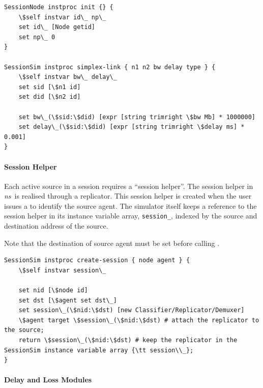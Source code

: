 \begin{verbatim}
SessionNode instproc init {} {
    \$self instvar id\_ np\_
    set id\_ [Node getid]
    set np\_ 0
}

SessionSim instproc simplex-link { n1 n2 bw delay type } {
    \$self instvar bw\_ delay\_
    set sid [\$n1 id]
    set did [\$n2 id]

    set bw\_(\$sid:\$did) [expr [string trimright \$bw Mb] * 1000000]
    set delay\_(\$sid:\$did) [expr [string trimright \$delay ms] * 0.001]
}
\end{verbatim}

\paragraph{Session Helper}
Each active source in a session requires a ``session helper''.
The session helper in \emph{ns}\ is realised through a replicator.
This session helper is created when the user issues a
 to identify the source agent.
The simulator itself keeps a reference to the session helper
in its instance variable array, {\tt session\_},
indexed by the source and destination address of the source.

Note that the destination of source agent must be set before
calling .

\begin{verbatim}
SessionSim instproc create-session { node agent } {
    \$self instvar session\_

    set nid [\$node id]
    set dst [\$agent set dst\_]
    set session\_(\$nid:\$dst) [new Classifier/Replicator/Demuxer]
    \$agent target \$session\_(\$nid:\$dst) # attach the replicator to the source;
    return \$session\_(\$nid:\$dst) # keep the replicator in the SessionSim instance variable array {\tt session\\_};
}
\end{verbatim}

\paragraph{Delay and Loss Modules}


